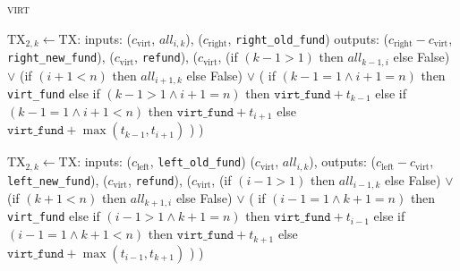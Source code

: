 \begin{center}
\begin{processbox}{\textsc{virt}}
\begin{algorithmic}[1]
         
          \State $\mathrm{TX}_{2, k} \gets \mathrm{TX}$:
          \Indent
            \State inputs:
            \Indent
              \State ($c_{\mathrm{virt}}$, $\mathit{all}_{i, k}$),
              \label{code:virtual-layer:mid-txs:extend-interval-left:virt}
              \State ($c_{\mathrm{right}}$, \texttt{right\_old\_fund})
            \EndIndent
            \State outputs:
            \Indent
              \State ($c_{\mathrm{right}} - c_{\mathrm{virt}}$,
              \texttt{right\_new\_fund}),
              \State ($c_{\mathrm{virt}}$, \texttt{refund}),
              \State ($c_{\mathrm{virt}}$,
              \Indent
                \State (if $(k-1 > 1)$ then $\mathit{all}_{k-1, i}$ else False)
                \State $\vee$ (if $(i+1 < n)$ then $\mathit{all}_{i+1, k}$ else
                False)
                \State $\vee$ (
                \Indent
                  \State if $(k-1 = 1 \wedge i+1 = n)$ then \texttt{virt\_fund}
                  \State else if $(k-1 > 1 \wedge i+1 = n)$ then
                  $\texttt{virt\_fund} + t_{k-1}$
                  \State else if $(k-1 = 1 \wedge i+1 < n)$ then
                  $\texttt{virt\_fund} + t_{i+1}$
                  \State else 
                  $\texttt{virt\_fund} + \max{(t_{k-1}, t_{i+1})}$
                \EndIndent
                \State )
              \EndIndent
              \State )
            \EndIndent
          \EndIndent
        \EndFor

         
          \State $\mathrm{TX}_{2, k} \gets \mathrm{TX}$:
          \Indent
            \State inputs:
            \Indent
              \State ($c_{\mathrm{left}}$, \texttt{left\_old\_fund})
              \State ($c_{\mathrm{virt}}$, $\mathit{all}_{i, k}$),
            \EndIndent
            \State outputs:
            \Indent
              \State ($c_{\mathrm{left}} - c_{\mathrm{virt}}$,
              \texttt{left\_new\_fund}),
              \label{code:virtual-layer:mid-txs:extend-interval-right:new-fund}
              \State ($c_{\mathrm{virt}}$, \texttt{refund}),
              \State ($c_{\mathrm{virt}}$,
              \Indent
                \State (if $(i-1 > 1)$ then $\mathit{all}_{i-1, k}$ else False)
                \State $\vee$ (if $(k+1 < n)$ then $\mathit{all}_{k+1, i}$ else
                False)
                \State $\vee$ (
                \Indent
                  \State if $(i-1 = 1 \wedge k+1 = n)$ then \texttt{virt\_fund}
                  \State else if $(i-1 > 1 \wedge k+1 = n)$ then
                  $\texttt{virt\_fund} + t_{i-1}$
                  \State else if $(i-1 = 1 \wedge k+1 < n)$ then
                  $\texttt{virt\_fund} + t_{k+1}$
                  \State else 
                  $\texttt{virt\_fund} + \max{(t_{i-1}, t_{k+1})}$
                \EndIndent
                \State )
              \EndIndent
              \State )
            \EndIndent
          \EndIndent
        \EndFor


\end{algorithmic}
\end{processbox}
\end{center}

